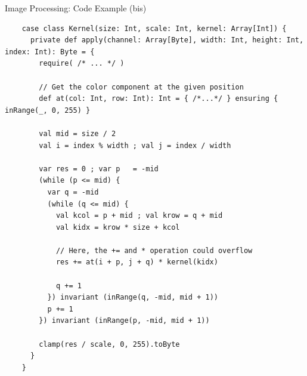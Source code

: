 \documentclass[xcolor={usenames,dvipsnames}]{beamer}
\begin{document}
\begin{frame}[fragile]{Image Processing: Code Example (bis)}
  \begin{verbatim}
    case class Kernel(size: Int, scale: Int, kernel: Array[Int]) {
      private def apply(channel: Array[Byte], width: Int, height: Int, index: Int): Byte = {
        require( /* ... */ )

        // Get the color component at the given position
        def at(col: Int, row: Int): Int = { /*...*/ } ensuring { inRange(_, 0, 255) }

        val mid = size / 2
        val i = index % width ; val j = index / width

        var res = 0 ; var p   = -mid
        (while (p <= mid) {
          var q = -mid
          (while (q <= mid) {
            val kcol = p + mid ; val krow = q + mid
            val kidx = krow * size + kcol

            // Here, the += and * operation could overflow
            res += at(i + p, j + q) * kernel(kidx)

            q += 1
          }) invariant (inRange(q, -mid, mid + 1))
          p += 1
        }) invariant (inRange(p, -mid, mid + 1))

        clamp(res / scale, 0, 255).toByte
      }
    }
  \end{verbatim}
\end{frame}
\end{document}
